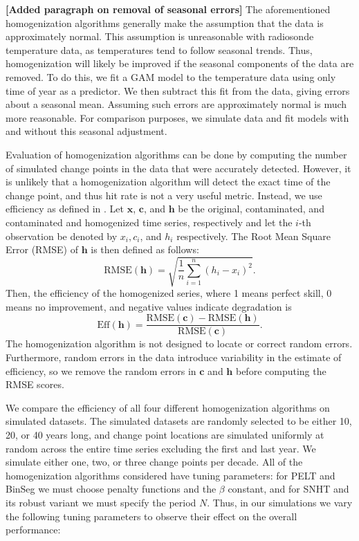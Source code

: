 \documentclass[12pt]{article}
\begin{document}
\begin{doublespacing}
\textbf{[Added paragraph on removal of seasonal errors]}
The aforementioned homogenization algorithms generally make the assumption that the data is approximately normal.  This assumption is unreasonable with radiosonde temperature data, as temperatures tend to follow seasonal trends.  Thus, homogenization will likely be improved if the seasonal components of the data are removed.  To do this, we fit a GAM model to the temperature data using only time of year as a predictor.  We then subtract this fit from the data, giving errors about a seasonal mean.  Assuming such errors are approximately normal is much more reasonable.  For comparison purposes, we simulate data and fit models with and without this seasonal adjustment.

Evaluation of homogenization algorithms can be done by computing the number of simulated change points in the data that were accurately detected.  However, it is unlikely that a homogenization algorithm will detect the exact time of the change point, and thus hit rate is not a very useful metric.  Instead, we use efficiency as defined in \cite{domonkos13}.  Let $\mathbf{x}$, $\mathbf{c}$, and $\mathbf{h}$ be the original, contaminated, and contaminated and homogenized time series, respectively and let the $i$-th observation be denoted by $x_i, c_i$, and $h_i$ respectively.  The Root Mean Square Error (RMSE) of $\mathbf{h}$ is then defined as follows:
\begin{equation*}
	\mbox{RMSE}(\mathbf{h}) = \sqrt{\frac{1}{n} \sum_{i=1}^n (h_i-x_i)^2}.
\end{equation*}
Then, the efficiency of the homogenized series, where 1 means perfect skill, 0 means no improvement, and negative values indicate degradation is
\begin{equation*}
	\mbox{Eff}(\mathbf{h}) = \frac{\mbox{RMSE}(\mathbf{c})-\mbox{RMSE}(\mathbf{h})}{\mbox{RMSE}(\mathbf{c})}.
\end{equation*}
The homogenization algorithm is not designed to locate or correct random errors.  Furthermore, random errors in the data introduce variability in the estimate of efficiency, so we remove the random errors in $\mathbf{c}$ and $\mathbf{h}$ before computing the RMSE scores.  

We compare the efficiency of all four different homogenization algorithms on simulated datasets.  The simulated datasets are randomly selected to be either  10, 20, or 40 years long, and change point locations are simulated uniformly at random across the entire time series excluding the first and last year.  We simulate either one, two, or three change points per decade.  All of the homogenization algorithms considered have tuning parameters: for PELT and BinSeg we must choose penalty functions and the $\beta$ constant, and for SNHT and its robust variant we must specify the period $N$.  Thus, in our simulations we vary the following tuning parameters to observe their effect on the overall performance:


\end{doublespacing}
\end{document}
